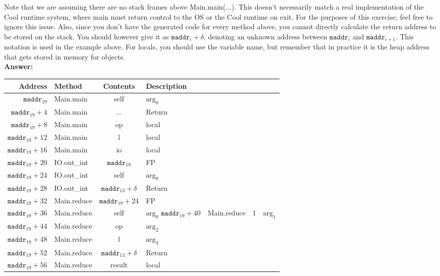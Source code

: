 \documentclass[11pt]{article}
\begin{document}
\begin{enumerate}
\begin{enumerate}
    Note that we are assuming there are no stack frames above Main.main(...). This doesn't necessarily match a real implementation of the Cool runtime system, where main must return control to the OS or the Cool runtime on exit. For the purposes of this exercise, feel free to ignore this issue. Also, since you don't have the generated code for every method above, you cannot directly calculate the return address to be stored on the stack. You should however give it as $\mathtt{maddr}_{i}+\delta$, denoting an unknown address between $\mathtt{maddr}_{i}$ and $\mathtt{maddr}_{i+1}$. This notation is used in the example above. For locals, you should use the variable name, but remember that in practice it is the heap address that gets stored in memory for objects.\\
    \textbf{Answer:} \\
    \begin{tabular}{ | r | l | c | l | }
    \hline
    Address & Method & Contents & Description \\
    \hline
    $\mathtt{maddr}_{19}$ & Main.main & self & $\mbox{arg}_0$ \\
    \hline
    $\mathtt{maddr}_{19}+4$ & Main.main & ... & Return \\
    \hline
    $\mathtt{maddr}_{19}+8$ & Main.main & op & local \\
    \hline
    $\mathtt{maddr}_{19}+12$ & Main.main & l & local \\
    \hline
    $\mathtt{maddr}_{19}+16$ & Main.main & io & local \\
    \hline
    $\mathtt{maddr}_{19}+20$ & IO.out_int & $\mathtt{maddr}_{19}$ & FP \\
    \hline
    $\mathtt{maddr}_{19}+24$ & IO.out_int & self & $\mbox{arg}_0$ \\
	\hline
    $\mathtt{maddr}_{19}+28$ & IO.out_int & $\mathtt{maddr}_{13}+\delta$ & Return \\
    \hline
    $\mathtt{maddr}_{19}+32$ & Main.reduce & $\mathtt{maddr}_{19}+24$ & FP \\
    \hline
    $\mathtt{maddr}_{19}+36$ & Main.reduce & self & $\mbox{arg}_0$ 
    \hline
    $\mathtt{maddr}_{19}+40$ & Main.reduce & 1 & $\mbox{arg}_1$ \\	
	\hline
    $\mathtt{maddr}_{19}+44$ & Main.reduce & op & $\mbox{arg}_2$ \\
	\hline
    $\mathtt{maddr}_{19}+48$ & Main.reduce & l & $\mbox{arg}_3$ \\
	\hline
    $\mathtt{maddr}_{19}+52$ & Main.reduce & $\mathtt{maddr}_{13}+\delta$ & Return \\
	\hline
    $\mathtt{maddr}_{19}+56$ & Main.reduce & result & local \\
    \end{tabular} \\
    

\end{enumerate}
\end{enumerate}
\end{document}
